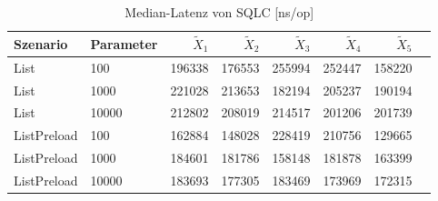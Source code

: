 
\begin{table}[ht]
\setlength{\extrarowheight}{-1pt}
\centering
\caption{Median-Latenz von SQLC [ns/op]}
\begin{tabular}{llrrrrrr}
\toprule
Szenario & Parameter & ${\tilde{X}_1}$ & ${\tilde{X}_2}$ & ${\tilde{X}_3}$ & ${\tilde{X}_4}$ & ${\tilde{X}_5}$ \\
\midrule
	List & 100 & 196338 & 176553 & 255994 & 252447 & 158220 \\
	List & 1000 & 221028 & 213653 & 182194 & 205237 & 190194 \\
	List & 10000 & 212802 & 208019 & 214517 & 201206 & 201739 \\
	ListPreload & 100 & 162884 & 148028 & 228419 & 210756 & 129665 \\
	ListPreload & 1000 & 184601 & 181786 & 158148 & 181878 & 163399 \\
	ListPreload & 10000 & 183693 & 177305 & 183469 & 173969 & 172315 \\
\bottomrule
\end{tabular}
\label{tab:durchsatz_sqlc}
\end{table}
	